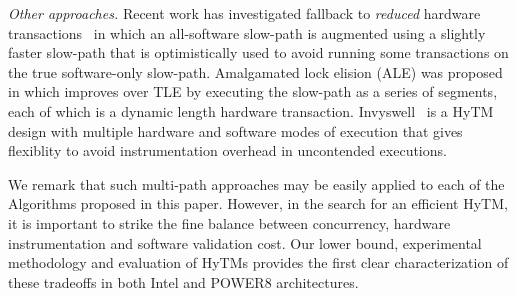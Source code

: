 \vspace{1mm}\noindent\textit{Other approaches.}
Recent work has investigated fallback to \emph{reduced} hardware transactions~\cite{MS13}
in which an all-software slow-path is augmented using a slightly faster slow-path 
that is optimistically used to avoid running some transactions on the true software-only slow-path.
Amalgamated lock elision (ALE) was proposed in \cite{ale15} which improves over TLE
by executing the slow-path as a series of segments, each of which is a dynamic length hardware transaction.
Invyswell~\cite{Calciu14} is a HyTM design with multiple hardware and software modes of execution that gives flexiblity to avoid instrumentation overhead in uncontended executions.

We remark that such multi-path approaches may be easily applied to each of the Algorithms proposed in this paper. However, 
in the search for an efficient HyTM, it is important to strike the fine balance between concurrency, hardware instrumentation and software validation cost.
Our lower bound, experimental methodology and evaluation of HyTMs provides the first clear characterization of these tradeoffs in both Intel and POWER8 architectures. 
%